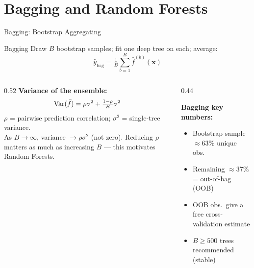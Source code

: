 \documentclass[aspectratio=169, 10pt]{beamer}
\begin{document}
\section{Bagging and Random Forests}


\begin{frame}{Bagging: Bootstrap Aggregating}
  \begin{definitionbox}{Bagging}
    {\footnotesize Draw $B$ bootstrap samples; fit one deep tree on each; average:
    \vspace{-6pt}
    \[ \hat{y}_{\mathrm{bag}} = \tfrac{1}{B}\sum_{b=1}^{B} \hat{f}^{(b)}(\mathbf{x}) \]
    \vspace{-8pt}
    }
  \end{definitionbox}

  \vspace{-6pt}
  \begin{columns}[T]
    \begin{column}{0.52\textwidth}
      \footnotesize
      \textbf{Variance of the ensemble:}
      \vspace{-6pt}
      \[ \operatorname{Var}(\bar{f}) = \rho\sigma^2 + \tfrac{1-\rho}{B}\sigma^2 \]
      \vspace{-8pt}
      $\rho$ = pairwise prediction correlation;
      $\sigma^2$ = single-tree variance.\\[1pt]
      As $B \to \infty$, variance $\to \rho\sigma^2$ (not zero).
      Reducing $\rho$ matters as much as increasing $B$
      — this motivates Random Forests.
    \end{column}
    \begin{column}{0.44\textwidth}
      \begin{keybox}
        \footnotesize
        \textbf{Bagging key numbers:}
        \begin{itemize}
          \item Bootstrap sample $\approx 63\%$ unique obs.\
          \item Remaining $\approx 37\%$ = out-of-bag (OOB)
          \item OOB obs.\ give a free cross-validation estimate
          \item $B \geq 500$ trees recommended (stable)
        \end{itemize}
      \end{keybox}
    \end{column}
  \end{columns}
\end{frame}
\end{document}
